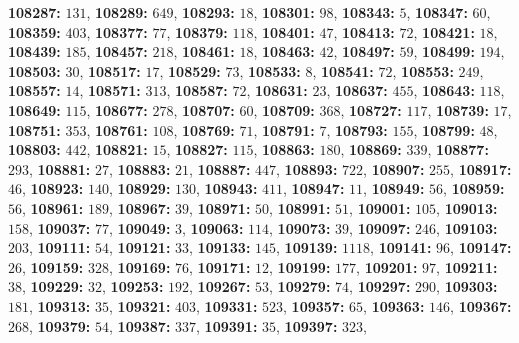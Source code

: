 \textsf{\bfseries 108287:} $131$, \textsf{\bfseries 108289:} $649$, \textsf{\bfseries 108293:} $18$, \textsf{\bfseries 108301:} $98$, \textsf{\bfseries 108343:} $5$, \textsf{\bfseries 108347:} $60$, \textsf{\bfseries 108359:} $403$, \textsf{\bfseries 108377:} $77$, \textsf{\bfseries 108379:} $118$, \textsf{\bfseries 108401:} $47$, \textsf{\bfseries 108413:} $72$, \textsf{\bfseries 108421:} $18$, \textsf{\bfseries 108439:} $185$, \textsf{\bfseries 108457:} $218$, \textsf{\bfseries 108461:} $18$, \textsf{\bfseries 108463:} $42$, \textsf{\bfseries 108497:} $59$, \textsf{\bfseries 108499:} $194$, \textsf{\bfseries 108503:} $30$, \textsf{\bfseries 108517:} $17$, \textsf{\bfseries 108529:} $73$, \textsf{\bfseries 108533:} $8$, \textsf{\bfseries 108541:} $72$, \textsf{\bfseries 108553:} $249$, \textsf{\bfseries 108557:} $14$, \textsf{\bfseries 108571:} $313$, \textsf{\bfseries 108587:} $72$, \textsf{\bfseries 108631:} $23$, \textsf{\bfseries 108637:} $455$, \textsf{\bfseries 108643:} $118$, \textsf{\bfseries 108649:} $115$, \textsf{\bfseries 108677:} $278$, \textsf{\bfseries 108707:} $60$, \textsf{\bfseries 108709:} $368$, \textsf{\bfseries 108727:} $117$, \textsf{\bfseries 108739:} $17$, \textsf{\bfseries 108751:} $353$, \textsf{\bfseries 108761:} $108$, \textsf{\bfseries 108769:} $71$, \textsf{\bfseries 108791:} $7$, \textsf{\bfseries 108793:} $155$, \textsf{\bfseries 108799:} $48$, \textsf{\bfseries 108803:} $442$, \textsf{\bfseries 108821:} $15$, \textsf{\bfseries 108827:} $115$, \textsf{\bfseries 108863:} $180$, \textsf{\bfseries 108869:} $339$, \textsf{\bfseries 108877:} $293$, \textsf{\bfseries 108881:} $27$, \textsf{\bfseries 108883:} $21$, \textsf{\bfseries 108887:} $447$, \textsf{\bfseries 108893:} $722$, \textsf{\bfseries 108907:} $255$, \textsf{\bfseries 108917:} $46$, \textsf{\bfseries 108923:} $140$, \textsf{\bfseries 108929:} $130$, \textsf{\bfseries 108943:} $411$, \textsf{\bfseries 108947:} $11$, \textsf{\bfseries 108949:} $56$, \textsf{\bfseries 108959:} $56$, \textsf{\bfseries 108961:} $189$, \textsf{\bfseries 108967:} $39$, \textsf{\bfseries 108971:} $50$, \textsf{\bfseries 108991:} $51$, \textsf{\bfseries 109001:} $105$, \textsf{\bfseries 109013:} $158$, \textsf{\bfseries 109037:} $77$, \textsf{\bfseries 109049:} $3$, \textsf{\bfseries 109063:} $114$, \textsf{\bfseries 109073:} $39$, \textsf{\bfseries 109097:} $246$, \textsf{\bfseries 109103:} $203$, \textsf{\bfseries 109111:} $54$, \textsf{\bfseries 109121:} $33$, \textsf{\bfseries 109133:} $145$, \textsf{\bfseries 109139:} $1118$, \textsf{\bfseries 109141:} $96$, \textsf{\bfseries 109147:} $26$, \textsf{\bfseries 109159:} $328$, \textsf{\bfseries 109169:} $76$, \textsf{\bfseries 109171:} $12$, \textsf{\bfseries 109199:} $177$, \textsf{\bfseries 109201:} $97$, \textsf{\bfseries 109211:} $38$, \textsf{\bfseries 109229:} $32$, \textsf{\bfseries 109253:} $192$, \textsf{\bfseries 109267:} $53$, \textsf{\bfseries 109279:} $74$, \textsf{\bfseries 109297:} $290$, \textsf{\bfseries 109303:} $181$, \textsf{\bfseries 109313:} $35$, \textsf{\bfseries 109321:} $403$, \textsf{\bfseries 109331:} $523$, \textsf{\bfseries 109357:} $65$, \textsf{\bfseries 109363:} $146$, \textsf{\bfseries 109367:} $268$, \textsf{\bfseries 109379:} $54$, \textsf{\bfseries 109387:} $337$, \textsf{\bfseries 109391:} $35$, \textsf{\bfseries 109397:} $323$, 
